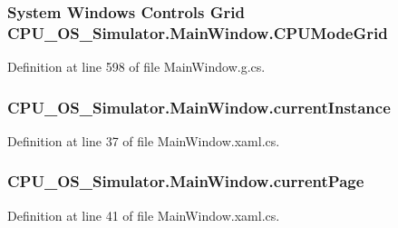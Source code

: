 \subsubsection[{C\+P\+U\+Mode\+Grid}]{\setlength{\rightskip}{0pt plus 5cm}System Windows Controls Grid C\+P\+U\+\_\+\+O\+S\+\_\+\+Simulator.\+Main\+Window.\+C\+P\+U\+Mode\+Grid\hspace{0.3cm}{\ttfamily [package]}}\label{class_c_p_u___o_s___simulator_1_1_main_window_ab6afb45d3f05517e9df6af167752be77}


Definition at line 598 of file Main\+Window.\+g.\+cs.

\hypertarget{class_c_p_u___o_s___simulator_1_1_main_window_a1280266cc57403a91f08a8350dee05cc}{}
\subsubsection[{current\+Instance}]{ C\+P\+U\+\_\+\+O\+S\+\_\+\+Simulator.\+Main\+Window.\+current\+Instance\hspace{0.3cm}{\ttfamily [static]}}\label{class_c_p_u___o_s___simulator_1_1_main_window_a1280266cc57403a91f08a8350dee05cc}


Definition at line 37 of file Main\+Window.\+xaml.\+cs.

\hypertarget{class_c_p_u___o_s___simulator_1_1_main_window_a14f6732faabdb632f3d29dbcbbb7059d}{}
\subsubsection[{current\+Page}]{ C\+P\+U\+\_\+\+O\+S\+\_\+\+Simulator.\+Main\+Window.\+current\+Page\hspace{0.3cm}{\ttfamily [private]}}\label{class_c_p_u___o_s___simulator_1_1_main_window_a14f6732faabdb632f3d29dbcbbb7059d}


Definition at line 41 of file Main\+Window.\+xaml.\+cs.

